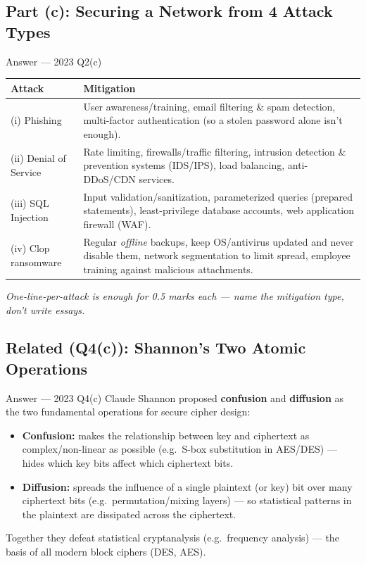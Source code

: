 \documentclass[12pt,a4paper]{article}
\begin{document}
\subsection{Part (c): Securing a Network from 4 Attack Types}
\begin{solbox}{Answer --- 2023 Q2(c)}
\begin{center}
\renewcommand{\arraystretch}{1.3}
\begin{tabular}{l|p{10cm}}
\toprule
\textbf{Attack} & \textbf{Mitigation} \\
\midrule
(i) Phishing & User awareness/training, email filtering \& spam detection, multi-factor authentication (so a stolen password alone isn't enough). \\
(ii) Denial of Service & Rate limiting, firewalls/traffic filtering, intrusion detection \& prevention systems (IDS/IPS), load balancing, anti-DDoS/CDN services. \\
(iii) SQL Injection & Input validation/sanitization, parameterized queries (prepared statements), least-privilege database accounts, web application firewall (WAF). \\
(iv) Clop ransomware & Regular \emph{offline} backups, keep OS/antivirus updated and never disable them, network segmentation to limit spread, employee training against malicious attachments. \\
\bottomrule
\end{tabular}
\end{center}
\textit{One-line-per-attack is enough for 0.5 marks each --- name the mitigation type, don't write essays.}
\end{solbox}

\subsection{Related (Q4(c)): Shannon's Two Atomic Operations}
\begin{solbox}{Answer --- 2023 Q4(c)}
Claude Shannon proposed \textbf{confusion} and \textbf{diffusion} as the two fundamental operations for secure cipher design:
\begin{itemize}[noitemsep]
  \item \textbf{Confusion:} makes the relationship between key and ciphertext as complex/non-linear as possible (e.g.\ S-box substitution in AES/DES) --- hides which key bits affect which ciphertext bits.
  \item \textbf{Diffusion:} spreads the influence of a single plaintext (or key) bit over many ciphertext bits (e.g.\ permutation/mixing layers) --- so statistical patterns in the plaintext are dissipated across the ciphertext.
\end{itemize}
Together they defeat statistical cryptanalysis (e.g.\ frequency analysis) --- the basis of all modern block ciphers (DES, AES).
\end{solbox}
\end{document}
